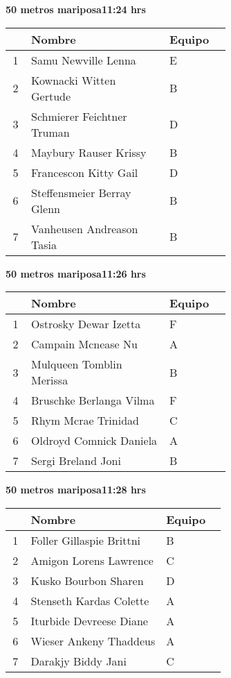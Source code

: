 \begin{minipage}{0.95\linewidth}
\begin{center}
\textbf{
50 metros mariposa\hspace{1cm}11:24 hrs}
\end{center}
\begin{tabular}{cp{0.63\linewidth}l}
\hline
& \textbf{Nombre} & \textbf{Equipo} \\ \hline
1 & Samu Newville Lenna & E \\ 
2 & Kownacki Witten Gertude & B \\ 
3 & Schmierer Feichtner Truman & D \\ 
4 & Maybury Rauser Krissy & B \\ 
5 & Francescon Kitty Gail & D \\ 
6 & Steffensmeier Berray Glenn & B \\ 
7 & Vanheusen Andreason Tasia & B \\ 
\end{tabular}
\end{minipage}
\begin{minipage}{0.95\linewidth}
\begin{center}
\textbf{
50 metros mariposa\hspace{1cm}11:26 hrs}
\end{center}
\begin{tabular}{cp{0.63\linewidth}l}
\hline
& \textbf{Nombre} & \textbf{Equipo} \\ \hline
1 & Ostrosky Dewar Izetta & F \\ 
2 & Campain Mcnease Nu & A \\ 
3 & Mulqueen Tomblin Merissa & B \\ 
4 & Bruschke Berlanga Vilma & F \\ 
5 & Rhym Mcrae Trinidad & C \\ 
6 & Oldroyd Comnick Daniela & A \\ 
7 & Sergi Breland Joni & B \\ 
\end{tabular}
\end{minipage}
\begin{minipage}{0.95\linewidth}
\begin{center}
\textbf{
50 metros mariposa\hspace{1cm}11:28 hrs}
\end{center}
\begin{tabular}{cp{0.63\linewidth}l}
\hline
& \textbf{Nombre} & \textbf{Equipo} \\ \hline
1 & Foller Gillaspie Brittni & B \\ 
2 & Amigon Lorens Lawrence & C \\ 
3 & Kusko Bourbon Sharen & D \\ 
4 & Stenseth Kardas Colette & A \\ 
5 & Iturbide Devreese Diane & A \\ 
6 & Wieser Ankeny Thaddeus & A \\ 
7 & Darakjy Biddy Jani & C \\ 
\end{tabular}
\end{minipage}
